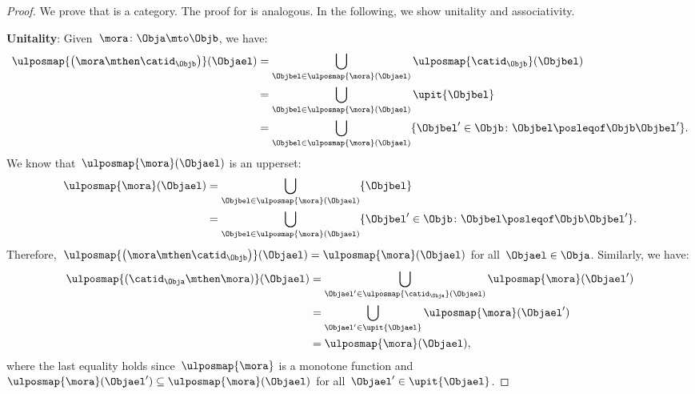 \begin{proof}
	We prove that \UPos is a category.
	The proof for \LPos is analogous.
	In the following, we show unitality and associativity.

	\textbf{Unitality}:
	Given~$\mora\colon \Obja \mto \Objb$, we have:
	\begin{equation*}
		\begin{aligned}
			\ulposmap{\left( \mora \mthen \catid_\Objb\right)}(\Objael) & =\bigcup_{\Objbel\in \ulposmap{\mora}(\Objael)}\ulposmap{\catid_\Objb}(\Objbel)                              \\
			                                                            & =\bigcup_{\Objbel\in \ulposmap{\mora}(\Objael)}\upit\{\Objbel\}                                              \\
			                                                            & =\bigcup_{\Objbel\in \ulposmap{\mora}(\Objael)}\{\Objbel'\in \Objb \colon \Objbel\posleqof\Objb \Objbel' \}.
		\end{aligned}
	\end{equation*}
	We know that~$\ulposmap{\mora}(\Objael)$ is an upperset:
	\begin{equation*}
		\begin{aligned}
			\ulposmap{\mora}(\Objael) & =\bigcup_{\Objbel\in \ulposmap{\mora}(\Objael)}\{\Objbel\}                                                   \\
			                          & =\bigcup_{\Objbel\in \ulposmap{\mora}(\Objael)}\{ \Objbel'\in \Objb \colon \Objbel\posleqof\Objb \Objbel'\}.
		\end{aligned}
	\end{equation*}
	Therefore,~$\ulposmap{\left( \mora \mthen \catid_\Objb\right)}(\Objael)=\ulposmap{\mora}(\Objael)$ for all~$\Objael\in \Obja$.
	Similarly, we have:
	\begin{equation*}
		\begin{aligned}
			\ulposmap{(\catid_\Obja \mthen \mora)}(\Objael) & =\bigcup_{\Objael'\in \ulposmap{\catid_\Obja}(\Objael)}\ulposmap{\mora}(\Objael') \\
			                                                & =\bigcup_{\Objael'\in \upit \{\Objael\}}\ulposmap{\mora}(\Objael')                \\
			                                                & =\ulposmap{\mora}(\Objael),
		\end{aligned}
	\end{equation*}
	where the last equality holds since~$\ulposmap{\mora}$ is a monotone function and~$\ulposmap{\mora}(\Objael')\subseteq \ulposmap{\mora}(\Objael)$ for all~$\Objael'\in \upit \{\Objael\}$.


\end{proof}
